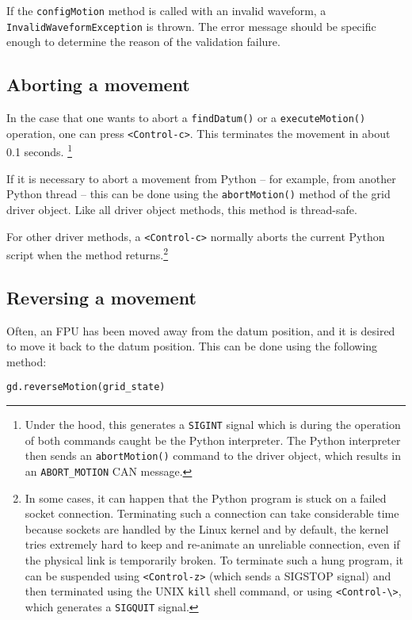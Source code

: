 \documentclass{scrartcl}[12pt,a4paper]
\begin{document}
If the \texttt{configMotion} method is called with an invalid
waveform, a \texttt{InvalidWaveformException} is thrown. The error
message should be specific enough to determine the reason of the
validation failure.


\subsection{Aborting a movement}

In the case that one wants to abort a \texttt{findDatum()} or a
\texttt{executeMotion()} operation, one can press
\verb+<Control-c>+. This terminates the movement in about 0.1
seconds. \footnote{Under the hood, this generates a \texttt{SIGINT}
  signal which is during the operation of both commands caught be the
  Python interpreter. The Python interpreter then sends an
  \texttt{abortMotion()} command to the driver object, which results
  in an \texttt{ABORT\_MOTION} CAN message.}

If it is necessary to abort a movement from Python -- for example,
from another Python thread -- this can be done using the
\texttt{abortMotion()} method of the grid driver object.  Like all
driver object methods, this method is thread-safe.

For other driver methods, a \verb+<Control-c>+ normally aborts the
current Python script when the method returns.\footnote{In some cases,
  it can happen that the Python program is stuck on a failed socket
  connection. Terminating such a connection can take considerable time
  because sockets are handled by the Linux kernel and by default, the
  kernel tries extremely hard to keep and re-animate an unreliable
  connection, even if the physical link is temporarily broken. To
  terminate such a hung program, it can be suspended using
  \texttt{<Control-z>} (which sends a SIGSTOP signal) and then
  terminated using the UNIX \texttt{kill} shell command, or using
  \texttt{<Control-\textbackslash>}, which generates a
  \texttt{SIGQUIT} signal.}


\subsection{Reversing a movement}
Often, an FPU has been moved away from the datum position, and it is
desired to move it back to the datum position.  This can be done using
the following method:

\begin{verbatim}
gd.reverseMotion(grid_state)
\end{verbatim}
\end{document}
